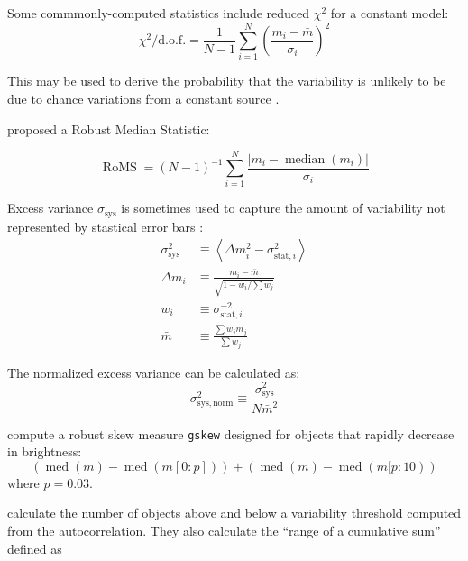 \documentclass[DM,authoryear,toc]{lsstdoc}
\begin{document}
Some commmonly-computed statistics include reduced $\chi^2$ for a constant model:
\begin{equation}
\chi^{2} / \mathrm{d} . \mathrm{o.f.}=\frac{1}{N-1} \sum_{i=1}^{N}\left(\frac{m_{i}-\bar{m}}{\sigma_{i}}\right)^{2}
\end{equation}

This may be used to derive the probability that the variability is unlikely to be due to chance variations from a constant source \citep[e.g.,][]{McLaughlin:96:EGRETVariability}.

\citet{Enoch:03:Variability} proposed a Robust Median Statistic:

\begin{equation}
\operatorname{RoMS}=(N-1)^{-1} \sum_{i=1}^{N} \frac{\left|m_{i}-\operatorname{median}\left(m_{i}\right)\right|}{\sigma_{i}}
\end{equation}

Excess variance $\sigma_{\mathrm{sys}}$ is sometimes used to capture the amount of variability not represented by stastical error bars \citep[e.g., in][]{2018PASP..130e4501B}:
\begin{equation}
\begin{aligned} \sigma_{\mathrm{sys}}^{2} & \equiv\left\langle\Delta m_{i}^{2}-\sigma_{\mathrm{stat}, i}^{2}\right\rangle \\ \Delta m_{i} & \equiv \frac{m_{i}-\bar{m}}{\sqrt{1-w_{i} / \sum w_{j}}} \\ w_{i} & \equiv \sigma_{\mathrm{stat}, i}^{-2} \\ \bar{m} & \equiv \frac{\sum w_{j} m_{j}}{\sum w_{j}} \end{aligned}
\end{equation}

The normalized excess variance can be calculated \citep[e.g.,][]{Nandra:97:AGNVarability,Allevato:13:AGNVariability} as:
\begin{equation}
	\sigma_{\mathrm{sys,norm}}^2  \equiv \frac{\sigma_{\mathrm{sys}}^2} {N \bar{m}^2}
\end{equation}

\citet{Richards:12:ASASCatalog} compute a robust skew measure \texttt{gskew} designed for objects that rapidly decrease in brightness:
$$
(\operatorname{med}(m)-\operatorname{med}(m[0 : p]))+(\operatorname{med}(m)-\operatorname{med}(m[p : 10))
$$
where $p = 0.03$.

\citet{Kim:11:QSOVariability} calculate the number of objects above and below a variability threshold computed from the autocorrelation.
They also calculate the ``range of a cumulative sum'' defined as
\end{document}
